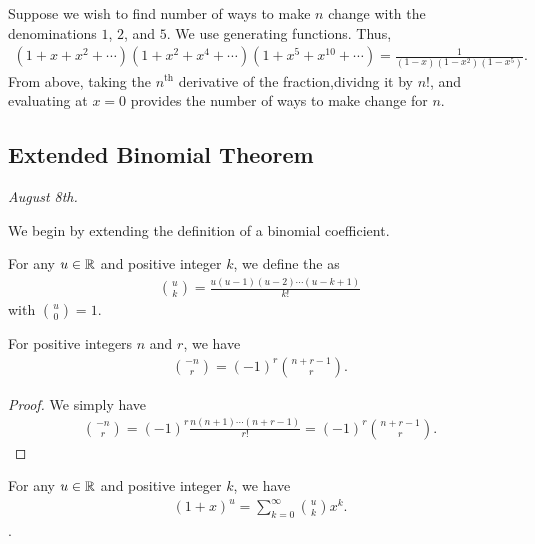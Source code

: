
\begin{example}
    Suppose we wish to find number of ways to make $n$ change with the denominations $1$, $2$, and $5$. We use generating functions. Thus,
    \begin{align}
        (1+x+x^{2}+\cdots)(1+x^{2}+x^{4}+\cdots)(1+x^{5}+x^{10}+\cdots) = \frac{1}{(1-x)(1-x^{2})(1-x^{5})}.
    \end{align}
    From above, taking the $n^{\text{th}}$ derivative of the fraction,dividng it by $n!$, and evaluating at $x = 0$ provides the number of ways to make change for $n$.
\end{example}

\subsection{Extended Binomial Theorem}
\textit{August 8th.}

We begin by extending the definition of a binomial coefficient.

\begin{definition}
    For any $u \in \mathbb{R}$ and positive integer $k$, we define the  as
    \begin{align}
        \binom{u}{k} = \frac{u(u-1)(u-2) \cdots (u-k+1)}{k!}
    \end{align}
    with $\binom{u}{0} = 1$.
\end{definition}

\begin{theorem}
    For positive integers $n$ and $r$, we have
    \begin{align}
        \binom{-n}{r} = (-1)^{r} \binom{n+r-1}{r}.
    \end{align}
\end{theorem}
\begin{proof}
    We simply have
    \begin{align}
        \binom{-n}{r} = (-1)^{r} \frac{n(n+1) \cdots (n+r-1)}{r!} = (-1)^{r} \binom{n+r-1}{r}.
    \end{align}
\end{proof}
\begin{theorem}
    For any $u \in \mathbb{R}$ and positive integer $k$, we have
    \begin{align}
        (1+x)^{u} = \sum_{k=0}^{\infty} \binom{u}{k} x^{k}.
    \end{align}.
\end{theorem}

